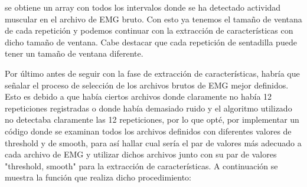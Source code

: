 se obtiene un array con todos los intervalos donde se ha detectado actividad muscular en el archivo de EMG bruto. Con esto ya tenemos el tamaño de ventana de cada repetición y podemos continuar con la extracción de características con dicho tamaño de ventana. Cabe destacar que cada repetición de sentadilla puede tener un tamaño de  ventana diferente.

Por último antes de seguir con la fase de extracción de características, habría que señalar el proceso de selección de los archivos brutos de EMG mejor definidos. Esto es debido a que había ciertos archivos donde claramente no había 12 repeticiones registradas o donde había demasiado ruido y el algoritmo utilizado no detectaba claramente las 12 repeticiones, por lo que opté, por implementar un código donde se examinan todos los archivos definidos con diferentes valores de threshold y de smooth, para así hallar cual sería el par de valores más adecuado a cada archivo de EMG y utilizar dichos archivos junto con su par de valores "threshold, smooth" para la extracción de características. A continuación se muestra la función que realiza dicho procedimiento:



